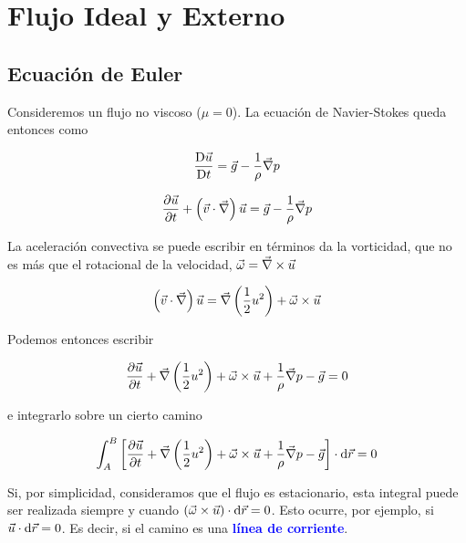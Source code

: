 \chapter[Flujo Ideal y Externo]{Flujo Ideal y Externo}
\section{Ecuación de Euler}

	
	Consideremos un flujo no viscoso ($\mu=0$). La ecuación de Navier-Stokes
	queda entonces como 
	
\begin{equation}
		\frac{\text{D} \vec{u}}{\text{D} t}=\vec{g}-\frac{1}{\rho}\vec{\nabla}p
\end{equation}
	
	
\begin{equation}
		\frac{\partial \vec{u}}{\partial t}+\left(\vec v \cdot \vec \nabla\right)\vec{u}=\vec{g}-\frac{1}{\rho}\vec{\nabla}p
\end{equation}
	
	
	La aceleración convectiva se puede escribir en términos da la vorticidad,
	que no es más que el rotacional de la velocidad, $\vec{\omega}=\vec \nabla \times\vec{u}$
	
\begin{equation}
		\left(\vec v \cdot \vec \nabla\right)\vec{u}=\vec{\nabla}\left(\frac{1}{2}u^{2}\right)+\vec{\omega}\times\vec{u}
\end{equation}
	
	
	
	Podemos entonces escribir 
	
\begin{equation}
		\frac{\partial \vec{u}}{\partial t}+\vec{\nabla}\left(\frac{1}{2}u^{2}\right)+\vec{\omega}\times\vec{u}+\frac{1}{\rho}\vec{\nabla}p-\vec{g}=0
\end{equation}
	
	e integrarlo sobre un cierto camino 
	
\begin{equation}
		\int_{A}^{B}\left[\frac{\partial \vec{u}}{\partial t}+\vec{\nabla}\left(\frac{1}{2}u^{2}\right)+\vec{\omega}\times\vec{u}+\frac{1}{\rho}\vec{\nabla}p-\vec{g}\right]\cdot\text{d}\vec{r}=0
\end{equation}
	
	
	Si, por simplicidad, consideramos que el flujo es estacionario, esta
	integral puede ser realizada siempre y cuando $\left(\vec{\omega}\times\vec{u}\right)\cdot\text{d}\vec{r}=0$.
	Esto ocurre, por ejemplo, si $\vec{u}\cdot\text{d}\vec{r}=0$. Es decir,
	si el camino es una \textbf{\textcolor{blue}{línea de corriente}}.

